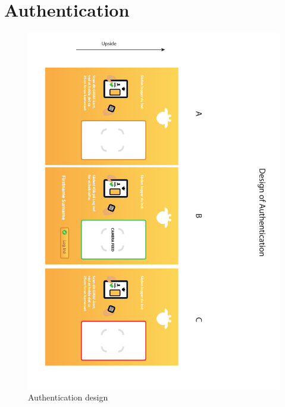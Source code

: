 \section{Authentication}
\begin{figure}[h!]
	\centering
	\includegraphics[width=\textwidth]{gfx/appendix_design_authentication.pdf}
	\caption{Authentication design}
	\label{app:design:authentication}
\end{figure}